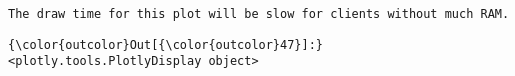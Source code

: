 \documentclass[11pt]{article}
\begin{document}
    \begin{Verbatim}[commandchars=\\\{\}]
The draw time for this plot will be slow for clients without much RAM.

    \end{Verbatim}

\begin{Verbatim}[commandchars=\\\{\}]
{\color{outcolor}Out[{\color{outcolor}47}]:} <plotly.tools.PlotlyDisplay object>
\end{Verbatim}
            

    
    
    
    
\end{document}
